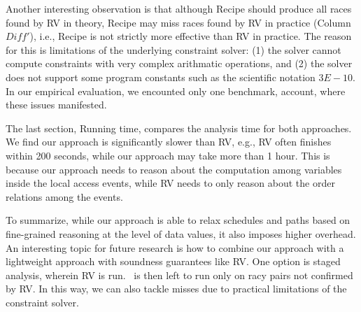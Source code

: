  

Another interesting observation is that although {\sf Recipe} should produce all races found by {\sf RV} in theory, {\sf Recipe} may miss races found by {\sf RV} in practice (Column $Diff'$), i.e., {\sf Recipe} is not strictly more effective than {\sf RV} in practice. The reason for this is limitations of the underlying constraint solver: (1) the solver cannot compute constraints with very complex arithmatic operations, and (2) the solver does not support some program constants such as the scientific notation $3E-10$. In our empirical evaluation, we encounted only one benchmark, account, where these issues manifested.

The last section, Running time, compares the analysis time for both approaches. We find our approach is significantly slower than {\sf RV}, e.g., {\sf RV} often finishes within 200 seconds, while our approach may take more than 1 hour. This is because our approach needs to reason about the computation among variables inside the local access events, while {\sf RV} needs to only reason about the order relations among the events.

To summarize, while our approach is able to relax schedules and paths based on  fine-grained reasoning at the level of data values, it also imposes higher overhead. An interesting topic for future research is how  to combine our approach with a lightweight approach with soundness guarantees like {\sf RV}. One option is staged analysis, wherein {\sf RV} is run. \tool\ is then left to run only on racy pairs not confirmed by {\sf RV}.
In this way, we can also tackle misses due to practical limitations of the constraint solver.
 













